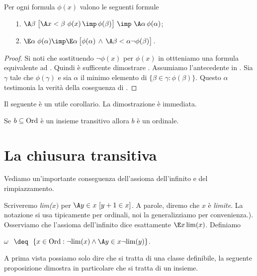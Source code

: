 \begin{proposition}
Per ogni formula $\phi(x)$ valono le seguenti formule
\begin{itemize}
\item[1.]$\A\beta\; \big[\A x<\beta\ \phi(x)\,\imp\,\phi(\beta)\big]\ \imp\ \A\alpha\,\phi(\alpha)$;
\item[2.]$\E\alpha\;\phi(\alpha)\imp \E\alpha\,\big[\phi(\alpha)\,\wedge\,\A\beta<\alpha\neg\phi(\beta)\big]$.
\end{itemize}
\end{proposition}

\begin{proof}
Si noti che sostituendo $\neg\phi(x)$ per $\phi(x)$ in  ottteniamo una formula equivalente ad . Quindi \`e sufficente dimostrare . Assumiamo l'antecedente in . Sia $\gamma$ tale che $\phi(\gamma)$ e sia $\alpha$ il minimo elemento di  $\{\beta\in\gamma : \phi(\beta)\}$. Questo $\alpha$ testimonia la verit\`a della coseguenza di .
\end{proof}

Il seguente \`e un utile corollario. La dimostrazione \`e immediata.

\begin{corollary}\label{prop_transitive_subset_Ord}
Se $b\subseteq{\rm Ord}$ \`e un insieme transitivo allora $b$ \`e un ordinale.\QED
\end{corollary}

\section{La chiusura transitiva}

\def\ceq#1#2{\parbox{15ex}{\hfill#1}\parbox{8ex}{\hfil#2}}


Vediamo un'importante conseguenza dell'assioma dell'infinito e del rimpiazzamento.

Scriveremo \emph{lim($x)$\/} per $\A y\in x\ [y+1\in x]$. A parole, diremo che $x$ \`e \emph{limite}. La notazione si usa tipicamente per ordinali, noi la generalizziamo per convenienza.). Osserviamo che l'assioma dell'infinito dice esattamente $\E x\,\lim(x)$. Definiamo

\hfil \emph{$\omega$}$\ \ \deq\ \ \{x\in\Ord: \neg\lim(x)\wedge\A y\in x\neg\lim(y)\}$. 

A prima vista possiamo solo dire che si tratta di una classe definibile, la seguente proposizione dimostra in particolare che si tratta di un insieme.

